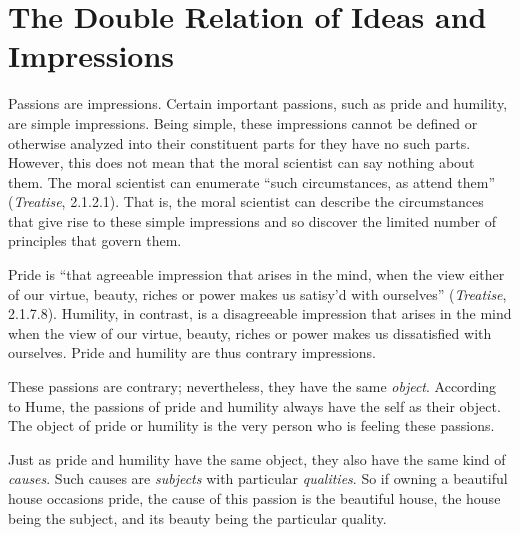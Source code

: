 

\section{The Double Relation of Ideas and Impressions}\label{sec:the_double_relation_of_ideas_and_impressions} %

Passions are impressions. Certain important passions, such as pride and humility, are simple impressions. Being simple, these impressions cannot be defined or otherwise analyzed into their constituent parts for they have no such parts. However, this does not mean that the moral scientist can say nothing about them. The moral scientist can enumerate ``such circumstances, as attend them'' (\emph{Treatise}, 2.1.2.1). That is, the moral scientist can describe the circumstances that give rise to these simple impressions and so discover the limited number of principles that govern them. \change

Pride is ``that agreeable impression that arises in the mind, when the view either of our virtue, beauty, riches or power makes us satisy'd with ourselves'' (\emph{Treatise}, 2.1.7.8). Humility, in contrast, is a disagreeable impression that arises in the mind when the view of our virtue, beauty, riches or power makes us dissatisfied with ourselves. Pride and humility are thus contrary impressions. \change

These passions are contrary; nevertheless, they have the same \emph{object}. According to Hume, the passions of pride and humility always have the self as their object. The object of pride or humility is the very person who is feeling these passions. \change

Just as pride and humility have the same object, they also have the same kind of \emph{causes}. Such causes are \emph{subjects} with particular \emph{qualities}. So if owning a beautiful house occasions pride, the cause of this passion is the beautiful house, the house being the subject, and its beauty being the particular quality. \change

